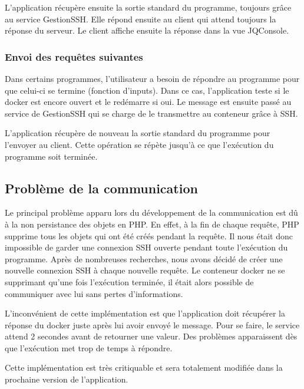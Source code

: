 \par L'application récupère ensuite la sortie standard du programme, toujours grâce au service GestionSSH. Elle répond ensuite au client qui attend toujours la réponse du serveur. Le client affiche ensuite la réponse dans la vue JQConsole.

\subsubsection{Envoi des requêtes suivantes}

\par Dans certains programmes, l'utilisateur a besoin de répondre au programme pour que celui-ci se termine (fonction d'inputs). Dans ce cas, l'application teste si le docker est encore ouvert et le redémarre si oui. Le message est ensuite passé au service de GestionSSH qui se charge de le transmettre au conteneur grâce à SSH.

\par L'application récupère de nouveau la sortie standard du programme pour l'envoyer au client. Cette opération se répète jusqu'à ce que l'exécution du programme soit terminée.

\subsection{Problème de la communication}

\par Le principal problème apparu lors du développement de la communication est dû à la non persistance des objets en PHP. En effet, à la fin de chaque requête, PHP supprime tous les objets qui ont été créés pendant la requête. Il nous était donc impossible de garder une connexion SSH ouverte pendant toute l'exécution du programme. Après de nombreuses recherches, nous avons décidé de créer une nouvelle connexion SSH à chaque nouvelle requête. Le conteneur docker ne se supprimant qu'une fois l'exécution terminée, il était alors possible de communiquer avec lui sans pertes d'informations.

\par L'inconvénient de cette implémentation est que l'application doit récupérer la réponse du docker juste après lui avoir envoyé le message. Pour se faire, le service attend 2 secondes avant de retourner une valeur. Des problèmes apparaissent dès que l'exécution met trop de temps à répondre.

\par Cette implémentation est très critiquable et sera totalement modifiée dans la prochaine version de l'application.

